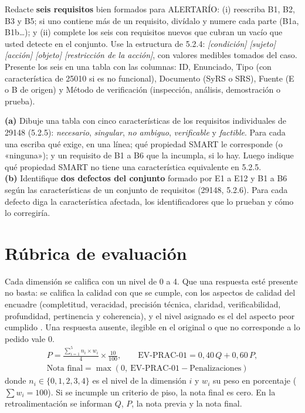 \documentclass[11pt]{article}
\newcommand{\seccion}[1]{\section{\textcolor{utegreendk}{#1}}}
\begin{document}
\begin{cajatarea}[title={T3. Redacción de requisitos bien formados \hfill D3 · 30\,\%}]
	Redacte \textbf{seis requisitos} bien formados para ALERTARÍO: (i) reescriba B1, B2, B3 y B5; si uno contiene más de un requisito, divídalo y numere cada parte (B1a, B1b\ldots); y (ii) complete los seis con requisitos nuevos que cubran un vacío que usted detecte en el conjunto. Use la estructura de 5.2.4: \emph{[condición] [sujeto] [acción] [objeto] [restricción de la acción]}, con valores medibles tomados del caso.\\[4pt]
	Presente los seis en una tabla con las columnas: ID, Enunciado, Tipo (con característica de 25010 si es no funcional), Documento (SyRS o SRS), Fuente (E o B de origen) y Método de verificación (inspección, análisis, demostración o prueba).
\end{cajatarea}

\begin{cajatarea}[title={T4. Sustento normativo de la calidad \hfill D4 · 20\,\% (junto con las citas de T1 a T3)}]
	\textbf{(a)} Dibuje una tabla con cinco características de los requisitos individuales de 29148 (5.2.5): \emph{necesario}, \emph{singular}, \emph{no ambiguo}, \emph{verificable} y \emph{factible}. Para cada una escriba qué exige, en una línea; qué propiedad SMART le corresponde (o «ninguna»); y un requisito de B1 a B6 que la incumpla, si lo hay. Luego indique qué propiedad SMART no tiene una característica equivalente en 5.2.5.\\[4pt]
	\textbf{(b)} Identifique \textbf{dos defectos del conjunto} formado por E1 a E12 y B1 a B6 según las características de un conjunto de requisitos (29148, 5.2.6). Para cada defecto diga la característica afectada, los identificadores que lo prueban y cómo lo corregiría.
\end{cajatarea}

\seccion{Rúbrica de evaluación}

Cada dimensión se califica con un nivel de 0 a 4. Que una respuesta esté presente no basta: se califica la calidad con que se cumple, con los aspectos de calidad del encuadre (completitud, veracidad, precisión técnica, claridad, verificabilidad, profundidad, pertinencia y coherencia), y el nivel asignado es el del aspecto peor cumplido \citep{brookhart_2018,panadero_jonsson_2020}. Una respuesta ausente, ilegible en el original o que no corresponde a lo pedido vale 0.
\begin{gather*}
	P = \frac{\sum_{i=1}^{5} n_i \times w_i}{4} \times \frac{10}{100}, \qquad \text{EV-PRAC-01} = 0{,}40\,Q + 0{,}60\,P,\\
	\text{Nota final} = \max(0,\ \text{EV-PRAC-01} - \text{Penalizaciones})
\end{gather*}
donde $n_i \in \{0,1,2,3,4\}$ es el nivel de la dimensión $i$ y $w_i$ su peso en porcentaje ($\sum w_i = 100$). Si se incumple un criterio de piso, la nota final es cero. En la retroalimentación se informan $Q$, $P$, la nota previa y la nota final.
\end{document}
